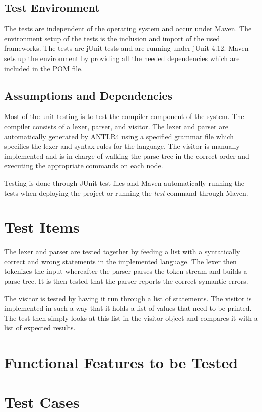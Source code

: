 \documentclass[english]{article}
\begin{document}
		\subsection{Test Environment}
	The tests are independent of the operating system and occur under Maven. The environment setup of the tests is the inclusion and import of the used frameworks. The tests are jUnit tests and are running under jUnit 4.12. Maven sets up the environment by providing all the needed dependencies which are included in the POM file.

		
			
		
		
		\subsection{Assumptions and Dependencies}
		Most of the unit testing is to test the compiler component of the system. The compiler consists of a lexer, parser, and visitor. The lexer and parser are automatically generated by ANTLR4 using a specified grammar file which specifies the lexer and syntax rules for the language. The visitor is manually implemented and is in charge of walking the parse tree in the correct order and executing the appropriate commands on each node.

			Testing is done through JUnit test files and Maven automatically running the tests when deploying the project or running the \textit{test} command through Maven.
		\section{Test Items}
			The lexer and parser are tested together by feeding a list with a syntatically correct and wrong statements in the implemented language. The lexer then tokenizes the input whereafter the parser parses the token stream and builds a parse tree. It is then tested that the parser reports the correct symantic errors.
			
			The visitor is tested by having it run through a list of statements. The visitor is implemented in such a way that it holds a list of values that need to be printed. The test then simply looks at this list in the visitor object and compares it with a list of expected results.
		
	\section{Functional Features to be Tested}
		\section{Test Cases}
\end{document}
